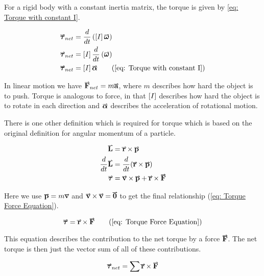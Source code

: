 \documentclass[main.tex]{subfiles}
\begin{document}
                    For a rigid body with a constant inertia matrix, the torque is given by \eqref{eq: Torque with constant I}.

                    \begin{align*}
                        \vect{\tau}_{net} &= \frac{d}{dt}\left(\mtrx{I} \vect{\omega}\right)\\
                        \vect{\tau}_{net} &= \mtrx{I} \frac{d}{dt}\left(\vect{\omega}\right)\\
                        \vect{\tau}_{net} &= \mtrx{I} \vect{\alpha}
                        \tag{\eqnum{eq: Torque with constant I}}
                    \end{align*}

                    In linear motion we have $\vect{F}_{net} = m\vect{a}$, where $m$ describes how hard the object is to push. Torque is analogous to force, in that $\left[I\right]$ describes how hard the object is to rotate in each direction and $\vect{\alpha}$ describes the acceleration of rotational motion.

                    There is one other definition which is required for torque which is based on the original definition for angular momentum of a particle.

                    \begin{align*}
                        \vect{L} &= \vect{r}\times\vect{p}\\
                        \frac{d}{dt}\vect{L} &= \frac{d}{dt}(\vect{r}\times\vect{p})\\
                        \vect{\tau} &= \vect{v}\times\vect{p} + \vect{r}\times\vect{F}
                    \end{align*}

                    Here we use $\vect{p}=m\vect{v}$ and $\vect{v}\times\vect{v} = \vect{0}$ to get the final relationship (\eqref{eq: Torque Force Equation}).

                    \begin{equation*}
                        \vect{\tau} = \vect{r}\times\vect{F}
                        \tag{\eqnum{eq: Torque Force Equation}}
                    \end{equation*}

                    This equation describes the contribution to the net torque by a force $\vect{F}$. The net torque is then just the vector sum of all of these contributions.

                    \begin{equation}
                        \vect{\tau}_{net} = \sum \vect{r}\times\vect{F}
                    \end{equation}

        \newpage

        
\end{document}
